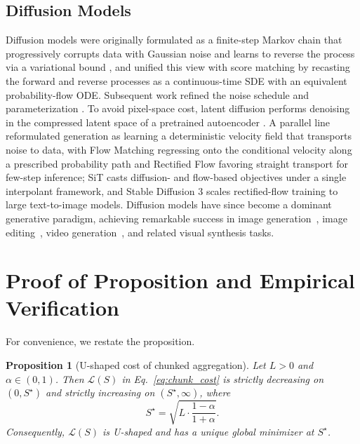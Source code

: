 \documentclass[]{ant_tech_report}
\newtheorem{proposition}{Proposition}
\begin{document}
\subsection{Diffusion Models}

Diffusion models were originally formulated as a finite-step Markov chain that progressively corrupts data with Gaussian noise and learns to reverse the process via a variational bound \citep{sohl2015deep,ho2020denoising}, and \citet{song2020score} unified this view with score matching by recasting the forward and reverse processes as a continuous-time SDE with an equivalent probability-flow ODE. Subsequent work refined the noise schedule and parameterization \citep{nichol2021improved,kingma2021variational,karras2022elucidating, song2020denoising}. To avoid pixel-space cost, latent diffusion performs denoising in the compressed latent space of a pretrained autoencoder \citep{rombach2022high}. A parallel line reformulated generation as learning a deterministic velocity field that transports noise to data, with Flow Matching \citep{lipman2022flow} regressing onto the conditional velocity along a prescribed probability path and Rectified Flow \citep{liu2022flow} favoring straight transport for few-step inference; SiT \citep{ma2024sit} casts diffusion- and flow-based objectives under a single interpolant framework, and Stable Diffusion 3 \citep{esser2024scaling} scales rectified-flow training to large text-to-image models. Diffusion models have since become a dominant generative paradigm, achieving remarkable success in image generation~\citep{wu2025qwen, xie2024sana, flux2024}, image editing~\citep{labs2025flux, ci2025describe, zhang2025test}, video generation~\citep{yang2024cogvideox, wan2025wan}, and related visual synthesis tasks.

\section{Proof of Proposition and Empirical Verification}
\label{app:chunk_proof}

For convenience, we restate the proposition.
\setcounter{proposition}{0}
\renewcommand{\theHproposition}{appendix.\arabic{proposition}}
\begin{proposition}[U-shaped cost of chunked aggregation]
Let $L>0$ and $\alpha\in(0,1)$. Then $\mathcal{L}(S)$ in
Eq.~\eqref{eq:chunk_cost} is strictly decreasing on $(0,S^\star)$ and strictly
increasing on $(S^\star,\infty)$, where
\begin{equation}
S^\star=\sqrt{L \cdot \frac{1-\alpha}{1+\alpha}}.
\end{equation}
Consequently, $\mathcal{L}(S)$ is U-shaped and has a unique global minimizer at
$S^\star$.
\end{proposition}
\end{document}
